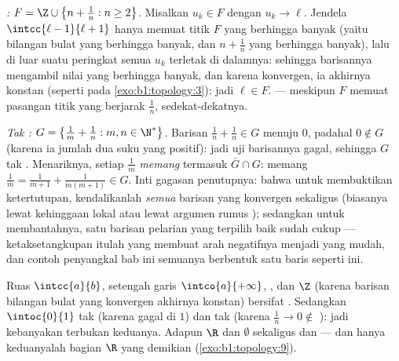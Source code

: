 \begin{example}\label{ex:b1:topology:seqtest}
\emph{:} $F = \Z \cup \bigl\{n + \frac1n : n \geq 2\bigr\}$.
Misalkan $u_k \in F$ dengan $u_k \to \ell$. Jendela $\intcc{\ell -
1}{\ell + 1}$ hanya memuat titik $F$ yang berhingga banyak (yaitu bilangan bulat
yang berhingga banyak, dan $n + \frac1n$ yang berhingga banyak), lalu di luar suatu peringkat
semua $u_k$ terletak di dalamnya: sehingga barisannya mengambil nilai yang berhingga
banyak, dan karena konvergen, ia akhirnya konstan (seperti pada
\cref{exo:b1:topology:3}): jadi $\ell \in F$.  --- meskipun
$F$ memuat pasangan titik yang berjarak $\frac1n$, sedekat-dekatnya.

\emph{Tak :} $G = \bigl\{\frac1m + \frac1n : m, n \in
\N^*\bigr\}$. Barisan $\frac1n + \frac1n \in G$ menuju
$0$, padahal $0 \notin G$ (karena ia jumlah dua suku yang positif): jadi
uji barisannya gagal, sehingga $G$ tak . Menariknya, setiap
$\frac1m$ \emph{memang} termasuk $\overline G \cap G$: memang
$\frac1m = \frac{1}{m+1} + \frac{1}{m(m+1)} \in G$. Inti gagasan
penutupnya: bahwa untuk membuktikan ketertutupan, kendalikanlah \emph{semua} barisan
yang konvergen sekaligus (biasanya lewat kehinggaan lokal atau lewat argumen
rumus ); sedangkan untuk membantahnya, satu barisan pelarian yang terpilih baik
sudah cukup --- ketaksetangkupan itulah yang membuat arah negatifnya
menjadi yang mudah, dan contoh penyangkal bab ini semuanya berbentuk
satu baris seperti ini.
\end{example}

\begin{example}\label{ex:b1:topology:closed}
Ruas $\intcc{a}{b}$, setengah garis $\intco{a}{+\infty}$, , dan $\Z$ (karena barisan bilangan bulat yang konvergen akhirnya konstan)
bersifat . Sedangkan $\intoc{0}{1}$ tak  (karena gagal di $1$) dan tak 
(karena $\frac 1n \to 0 \notin$ ): jadi kebanyakan  terbukan keduanya. Adapun $\R$ dan
$\emptyset$ sekaligus  dan  --- dan hanya keduanyalah
 bagian $\R$ yang demikian (\cref{exo:b1:topology:9}).
\end{example}

